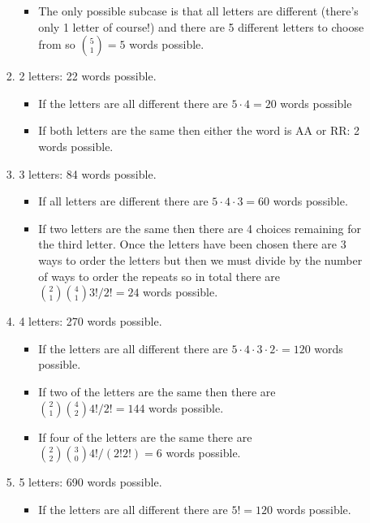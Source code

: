 \documentclass{article}
\begin{document}
\begin{enumerate}
\begin{enumerate}
\begin{enumerate}
\begin{itemize}
\item The only possible subcase is that all letters are different (there's only 1 letter of course!) and there are 5 different letters to choose from so $\binom{5}{1} = 5$ words possible. 
\end{itemize}

\item 2 letters: 22 words possible.

\begin{itemize}
\item If the letters are all different there are $5\cdot 4 = 20$ words possible 
\item If both letters are the same then either the word is AA or RR: 2 words possible.
\end{itemize}

\item 3 letters: 84 words possible.

\begin{itemize}
\item If all letters are different there are $5 \cdot 4 \cdot 3 = 60$ words possible.
\item If two letters are the same then there are 4 choices remaining for the third letter. Once the letters have been chosen there are 3 ways to order the letters but then we must divide by the number of ways to order the repeats so in total there are $\binom{2}{1}\binom{4}{1}3! / 2!= 24$ words possible.
\end{itemize}

\item 4 letters: 270 words possible. 

\begin{itemize}
\item If the letters are all different there are $5\cdot 4 \cdot 3 \cdot 2 \cdot = 120$ words possible.

\item If two of the letters are the same then there are $\binom{2}{1}\binom{4}{2} 4! / 2! = 144$ words possible.

\item If four of the letters are the same there are $\binom{2}{2}\binom{3}{0}4!/(2!2!) = 6$ words possible. 
\end{itemize}

\item 5 letters: 690 words possible. 

\begin{itemize}
\item If the letters are all different there are $5! = 120$ words possible.


\end{itemize}
\end{enumerate}
\end{enumerate}
\end{enumerate}
\end{document}
